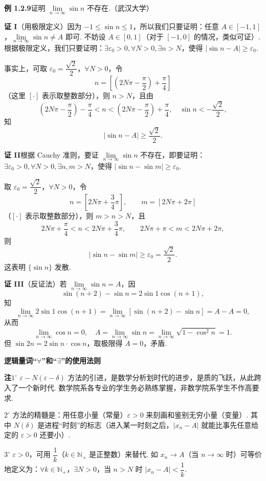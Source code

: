 \documentclass[UTF8, 12pt, fontset=fandol, oneside]{ctexart}
\begin{document}
\noindent\textbf{例 1.2.9}\quad 证明 $\lim\limits_{n\to\infty}\sin n$ 不存在.（武汉大学）

\noindent\textbf{证 I}\quad （用极限定义）因为 $-1\le\sin n\le1$，所以我们只要证明：任意 $A\in[-1,1]$，$\lim\limits_{n\to\infty}\sin n\ne A$ 即可. 不妨设 $A\in[0,1]$（对于 $[-1,0]$ 的情况，类似可证）. 根据极限定义，我们只要证明：$\exists\varepsilon_0>0,\forall N>0,\exists n>N$，使得 $|\sin n-A|\ge\varepsilon_0$.

事实上，可取 $\varepsilon_0=\dfrac{\sqrt2}{2}$，$\forall N>0$，令
\[
  n=\left[\left(2N\pi-\frac\pi2\right)+\frac\pi4\right]
\]
（这里 $[\cdot]$ 表示取整数部分），则 $n>N$，且由
\[
  \left(2N\pi-\frac\pi2\right)-\frac\pi4<n<\left(2N\pi-\frac\pi2\right)+\frac\pi4,\quad
  \sin n<-\frac{\sqrt2}{2},
\]
知
\[
  |\sin n-A|\ge\frac{\sqrt2}{2}.
\]

\noindent\textbf{证 II}\quad 根据 Cauchy 准则，要证 $\lim\limits_{n\to\infty}\sin n$ 不存在，即要证明：$\exists\varepsilon_0>0,\forall N>0,\exists n,m>N$，使得 $|\sin n-\sin m|\ge\varepsilon_0$.

取 $\varepsilon_0=\dfrac{\sqrt2}{2}$，$\forall N>0$，令
\[
  n=\left[2N\pi+\frac34\pi\right],\qquad m=[2N\pi+2\pi]
\]
（$[\cdot]$ 表示取整数部分），则 $m>n>N$，且
\[
  2N\pi+\frac\pi4<n<2N\pi+\frac34\pi,\qquad
  2N\pi+\pi<m<2N\pi+2\pi,
\]
则
\[
  |\sin n-\sin m|\ge \varepsilon_0=\frac{\sqrt2}{2}.
\]
这表明 $\{\sin n\}$ 发散.

\noindent\textbf{证 III}\quad （反证法）若 $\lim\limits_{n\to\infty}\sin n=A$，因
\[
  \sin(n+2)-\sin n=2\sin1\cos(n+1),
\]
知
\[
  \lim_{n\to\infty}2\sin1\cos(n+1)=\lim_{n\to\infty}[\sin(n+2)-\sin n]=A-A=0,
\]
从而
\[
  \lim_{n\to\infty}\cos n=0,\quad
  A=\lim_{n\to\infty}\sin n=\lim_{n\to\infty}\sqrt{1-\cos^2n}=1.
\]
但 $\sin2n=2\sin n\cdot\cos n$，取极限得 $A=0$，矛盾.

\noindent\textbf{逻辑量词“$\forall$”和“$\exists$”的使用法则}

\noindent\textbf{注}\quad $1^\circ$ $\varepsilon-N(\varepsilon-\delta)$ 方法的引进，是数学分析划时代的进步，是质的飞跃，从此跨入了一个新时代. 数学院系各专业的学生务必熟练掌握，非数学院系学生不作高要求.

$2^\circ$ 方法的精髓是：用任意小量（常量）$\varepsilon>0$ 来刻画和鉴别无穷小量（变量）. 其中 $N(\delta)$ 是进程“时刻”的标志（进入某一时刻之后，$|x_n-A|$ 就能比事先任意给定的 $\varepsilon>0$ 还要小）.

$3^\circ$ $\varepsilon>0$，可用 $\dfrac1k$（$k\in\mathbb{N}_+$ 是正整数）来替代. 如 $x_n\to A$（当 $n\to\infty$ 时）可等价地定义为：$\forall k\in\mathbb{N}_+$，$\exists N>0$，当 $n>N$ 时 $|x_n-A|<\dfrac1k$.
\end{document}

